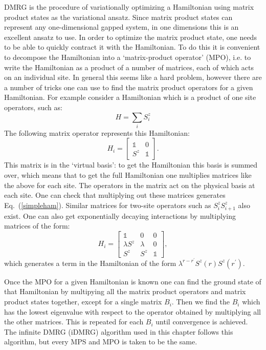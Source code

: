 DMRG is the procedure of variationally optimizing a Hamiltonian using matrix product states as the variational ansatz. Since matrix product states can represent any one-dimensional gapped system, in one dimensions this is an excellent ansatz to use. In order to optimize the matrix product state, one needs to be able to quickly contract it with the Hamiltonian. To do this it is convenient to decompose the Hamiltonian into a `matrix-product operator' (MPO), i.e. to write the Hamiltonian as a product of a number of matrices, each of which acts on an individual site. In general this seems like a hard problem, however there are a number of tricks one can use to find the matrix product operators for a given Hamiltonian. For example consider a Hamiltonian which is a product of one site operators, such as:
\begin{equation}
H=\sum_i S^z_i
\label{simpleham}
\end{equation}
The following matrix operator represents this Hamiltonian:
\begin{equation}
H_i=\left[\begin{array}{cc} \mathbb{1} & 0 \\ S^z & \mathbb{1}\end{array}\right].
\end{equation}
This matrix is in the `virtual basis': to get the Hamiltonian this basis is summed over, which means that to get the full Hamiltonian one multiplies matrices like the above for each site. The operators in the matrix act on the physical basis at each site. One can check that multiplying out these matrices generates Eq.~(\ref{simpleham}). Similar matrices for two-site operators such as $S^z_i S^z_{i+1}$ also exist. One can also get exponentially decaying interactions by multiplying matrices of the form:
\begin{equation}
H_i=\left[\begin{array}{ccc} \mathbb{1} & 0 & 0 \\ \lambda S^z & \lambda & 0 \\ S^z& S^z & \mathbb{1}\end{array}\right],
\end{equation}
which generates a term in the Hamiltonian of the form $\lambda^{r-r^\prime}S^z(r)S^z(r^\prime)$.

Once the MPO for a given Hamiltonian is known one can find the ground state of that Hamiltonian by multipying all the matrix product operators and matrix product states together, except for a single matrix $B_i$. Then we find the $B_i$ which has the lowest eigenvalue with respect to the operator obtained by multiplying all the other matrices. This is repeated for each $B_i$ until convergence is achieved. The infinite DMRG (iDMRG) algorithm used in this chapter follows this algorithm, but every MPS and MPO is taken to be the same.

